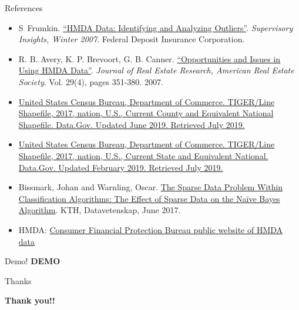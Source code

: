 \documentclass{beamer}
\begin{document}
\begin{frame}{References}

\footnotesize
\begin{itemize}
  \item S~Frumkin. \href{https://www.fdic.gov/regulations/examinations/supervisory/insights/siwin07/siwinter07-article4.pdf}{``HMDA Data: Identifying and Analyzing Outliers''}. \textit{Supervisory Insights, Winter 2007}.  Federal Deposit Insurance Corporation. 
 \item R. B. Avery, K. P. Brevoort, G. B. Canner. \href{https://ideas.repec.org/a/jre/issued/v29n42007p351-380.html
}{``Opportunities and Issues in Using HMDA Data''}. \textit{Journal of Real Estate Research, American Real Estate Society}. Vol. 29(4), pages 351-380. 2007.

\item \href{ https://catalog.data.gov/dataset/tiger-line-shapefile-2017-nation-u-s-current-county-and-equivalent-national-shapefile}{United States Census Bureau, Department of Commerce. TIGER/Line Shapefile, 2017, nation, U.S., Current County and Equivalent National Shapefile. Data.Gov. Updated June 2019. Retrieved July 2019.}

\item \href{https://catalog.data.gov/dataset/tiger-line-shapefile-2017-nation-u-s-current-state-and-equivalent-national  }{United States Census Bureau, Department of Commerce. TIGER/Line Shapefile, 2017, nation, U.S., Current State and Equivalent National. Data.Gov. Updated February 2019. Retrieved July 2019. }

\item Bissmark, Johan and Warnling, Oscar. \href{http://www.diva-portal.se/smash/get/diva2:1111045/FULLTEXT01.pdf}{The Sparse Data Problem Within Classification Algorithms: The Effect of Sparse Data on the Naïve Bayes Algorithm}. KTH, Datavetenskap, June 2017.

\item HMDA: \href{https://www.consumerfinance.gov/data-research/hmda/historic-data/}{Consumer Financial Protection Bureau public website of HMDA data}


\end{itemize}

\end{frame}

\begin{frame}{Demo!}
\textbf{DEMO}
\end{frame}

\begin{frame}{Thanks}

\textbf{Thank you!!}
\end{frame}
\end{document}
